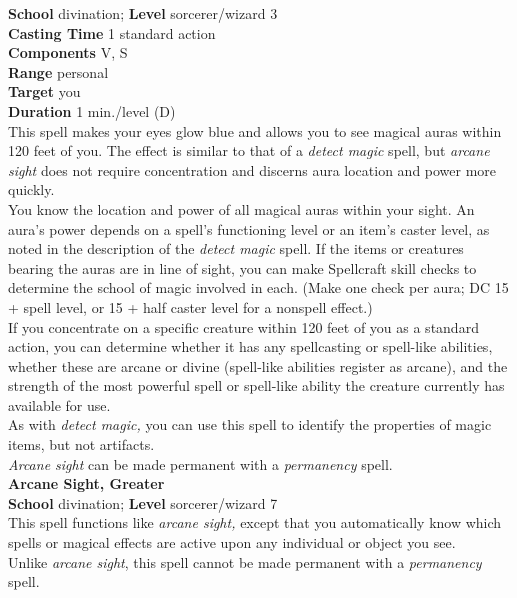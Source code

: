 \textbf{School} divination; \textbf{Level} sorcerer/wizard 3\\
\textbf{Casting Time} 1 standard action\\
\textbf{Components} V, S\\
\textbf{Range} personal\\
\textbf{Target} you\\
\textbf{Duration} 1 min./level (D)\\
This spell makes your eyes glow blue and allows you to see magical auras within 120 feet of you. The effect is similar to that of a \textit{detect magic }spell, but \textit{arcane sight }does not require concentration and discerns aura location and power more quickly.\\
You know the location and power of all magical auras within your sight. An aura's power depends on a spell's functioning level or an item's caster level, as noted in the description of the \textit{detect magic }spell. If the items or creatures bearing the auras are in line of sight, you can make Spellcraft skill checks to determine the school of magic involved in each. (Make one check per aura; DC 15 + spell level, or 15 + half caster level for a nonspell effect.)\\
If you concentrate on a specific creature within 120 feet of you as a standard action, you can determine whether it has any spellcasting or spell-like abilities, whether these are arcane or divine (spell-like abilities register as arcane), and the strength of the most powerful spell or spell-like ability the creature currently has available for use.\\
As with \textit{detect magic,} you can use this spell to identify the properties of magic items, but not artifacts.\\
\textit{Arcane sight }can be made permanent with a \textit{permanency }spell.\\
\textbf{Arcane Sight, Greater}\\
\textbf{School} divination; \textbf{Level} sorcerer/wizard 7\\
This spell functions like \textit{arcane sight, }except that you automatically know which spells or magical effects are active upon any individual or object you see.\\
Unlike \textit{arcane sight}, this spell cannot be made permanent with a \textit{permanency }spell.\\
